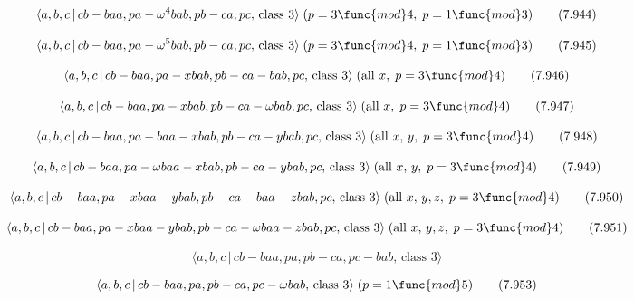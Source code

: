 \documentclass[10pt]{article}
\begin{document}
\begin{equation}
\langle a,b,c\,|\,cb-baa,pa-\omega ^{4}bab,pb-ca,pc,\,\text{class }3\rangle
\;(p=3\func{mod}4,\;p=1\func{mod}3)  \tag{7.944}
\end{equation}

\begin{equation}
\langle a,b,c\,|\,cb-baa,pa-\omega ^{5}bab,pb-ca,pc,\,\text{class }3\rangle
\;(p=3\func{mod}4,\;p=1\func{mod}3)  \tag{7.945}
\end{equation}

\begin{equation}
\langle a,b,c\,|\,cb-baa,pa-xbab,pb-ca-bab,pc,\,\text{class }3\rangle \;(%
\text{all }x,\;p=3\func{mod}4)  \tag{7.946}
\end{equation}

\begin{equation}
\langle a,b,c\,|\,cb-baa,pa-xbab,pb-ca-\omega bab,pc,\,\text{class }3\rangle
\;(\text{all }x,\;p=3\func{mod}4)  \tag{7.947}
\end{equation}

\begin{equation}
\langle a,b,c\,|\,cb-baa,pa-baa-xbab,pb-ca-ybab,pc,\,\text{class }3\rangle
\;(\text{all }x,\,y,\;p=3\func{mod}4)  \tag{7.948}
\end{equation}

\begin{equation}
\langle a,b,c\,|\,cb-baa,pa-\omega baa-xbab,pb-ca-ybab,pc,\,\text{class }%
3\rangle \;(\text{all }x,\,y,\;p=3\func{mod}4)  \tag{7.949}
\end{equation}

\begin{equation}
\langle a,b,c\,|\,cb-baa,pa-xbaa-ybab,pb-ca-baa-zbab,pc,\,\text{class }%
3\rangle \;(\text{all }x,\,y,z,\;p=3\func{mod}4)  \tag{7.950}
\end{equation}

\begin{equation}
\langle a,b,c\,|\,cb-baa,pa-xbaa-ybab,pb-ca-\omega baa-zbab,pc,\,\text{class 
}3\rangle \;(\text{all }x,\,y,z,\;p=3\func{mod}4)  \tag{7.951}
\end{equation}

\begin{equation}
\langle a,b,c\,|\,cb-baa,pa,pb-ca,pc-bab,\,\text{class }3\rangle  \tag{7.952}
\end{equation}

\begin{equation}
\langle a,b,c\,|\,cb-baa,pa,pb-ca,pc-\omega bab,\,\text{class }3\rangle
\;(p=1\func{mod}5)  \tag{7.953}
\end{equation}
\end{document}
